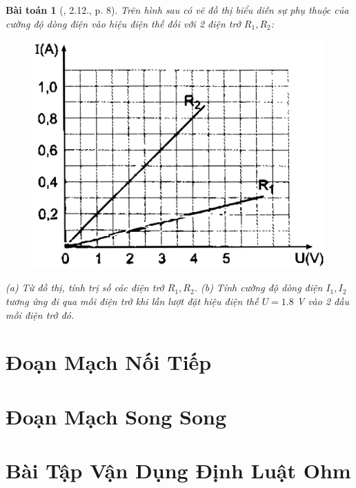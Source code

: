 \documentclass{article}
\newtheorem{baitoan}{Bài toán}
\begin{document}
\begin{baitoan}[\cite{SBT_Vat_Ly_9}, 2.12., p. 8]
	Trên hình sau có vẽ đồ thị biểu diễn sự phụ thuộc của cường độ dòng điện vào hiệu điện thế đối với 2 điện trở $R_1,R_2$:
	\begin{figure}[H]
		\centering
		\includegraphics[scale=0.3]{SBT_2.3}
	\end{figure}
	\noindent(a) Từ đồ thị, tính trị số các điện trở $R_1,R_2$. (b) Tính cường độ dòng điện $I_1,I_2$ tương ứng đi qua mỗi điện trở khi lần lượt đặt hiệu điện thế $U = 1.8$ \emph{V} vào 2 đầu mỗi điện trở đó.
\end{baitoan}


\section{Đoạn Mạch Nối Tiếp}


\section{Đoạn Mạch Song Song}


\section{Bài Tập Vận Dụng Định Luật Ohm}
\end{document}
